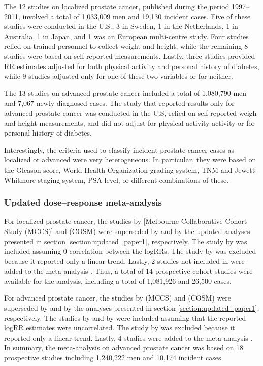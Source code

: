 The 12 studies on localized prostate cancer, published during the period 1997--2011, involved a total of 1,033,009 men and 19,130 incident cases. Five of these studies were conducted in the U.S., 3 in Sweden, 1 in the Netherlands, 1 in Australia, 1 in Japan, and 1 was an European multi-centre study. Four studies relied on trained personnel to collect weight and height, while the remaining 8 studies were based on self-reported measurements. Lastly, three studies provided RR estimates adjusted for both physical activity and personal history of diabetes, while 9 studies adjusted only for one of these two variables or for neither. 

The 13 studies on advanced prostate cancer included a total of 1,080,790 men and 7,067 newly diagnosed cases. The study that reported results only for advanced prostate cancer was conducted in the U.S, relied on self-reported weigh and height measurements, and did not adjust for physical activity activity or for personal history of diabetes.

Interestingly, the criteria used to classify incident prostate cancer cases as localized or advanced were very heterogeneous. In particular, they were based on the Gleason score, World Health Organization grading system, TNM and Jewett--Whitmore staging system, PSA level, or different combinations of these. 

\subsubsection{Updated dose--response meta-analysis}

For localized prostate cancer, the studies by \citet{macinnis_body_2003} [Melbourne Collaborative Cohort Study (MCCS)] and  (COSM) were superseded by \citet{bassett_weight_2012} and by the updated analyses presented in section \ref{section:updated_paper1}, respectively. The study by \citet{gong_obesity_2006} was included assuming 0 correlation between the logRRs. The study by \citet{schuurman_anthropometry_2000} was excluded because it reported only a linear trend. Lastly, 2 studies not included in  were added to the meta-analysis \citep{hernandez_relationship_2009, grotta_physical_2015}. Thus, a total of 14 prospective cohort studies were available for the analysis, including a total of 1,081,926 and 26,500 cases.

For advanced prostate cancer, the studies by \citet{macinnis_body_2003} (MCCS) and  (COSM) were superseded by \citet{bassett_weight_2012} and by the analyses presented in section \ref{section:updated_paper1}, respectively. The studies by \citet{habel_body_2000} and by \citet{gong_obesity_2006} were included assuming that the reported logRR estimates were uncorrelated. The study by \citet{schuurman_anthropometry_2000} was excluded because it reported only a linear trend. Lastly, 4 studies were added to the meta-analysis \citep{hernandez_relationship_2009, shafique_cholesterol_2012, grotta_physical_2015, moller_prostate_2015}. In summary, the meta-analysis on advanced prostate cancer was based on 18 prospective studies including 1,240,222 men and 10,174 incident cases.
